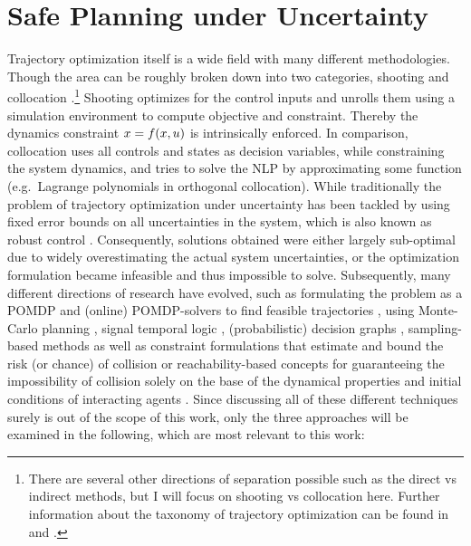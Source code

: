 \section{Safe Planning under Uncertainty}
\label{text:related/uncertainty}
Trajectory optimization itself is a wide field with many different methodologies. Though the area can be roughly broken down into two categories, shooting and collocation \cite{Kelly2017}.\footnote{There are several other directions of separation possible such as the direct vs indirect methods, but I will focus on shooting vs collocation here. Further information about the taxonomy of trajectory optimization can be found in \cite{Kelly2017} and \cite{Chai2020}.} Shooting optimizes for the control inputs and unrolls them using a simulation environment to compute objective and constraint. Thereby the dynamics constraint $x = f(x, u)$ is intrinsically enforced. In comparison, collocation uses all controls and states as decision variables, while constraining the system dynamics, and tries to solve the \ac{NLP} by approximating some function (e.g.\ Lagrange polynomials in orthogonal collocation).
\newline
While traditionally the problem of trajectory optimization under uncertainty has been tackled by using fixed error bounds on all uncertainties in the system, which is also known as robust control \cite{Bemporad1999}. Consequently, solutions obtained were either largely sub-optimal due to widely overestimating the actual system uncertainties, or the optimization formulation became infeasible and thus impossible to solve. Subsequently, many different directions of research have evolved, such as formulating the problem as a \ac{POMDP} and (online) \ac{POMDP}-solvers to find feasible trajectories \cite{Chen2016}, using Monte-Carlo planning \cite{Janson2015} \cite{Silver2010}, signal temporal logic \cite{Sadigh2016}, (probabilistic) decision graphs \cite{Koenig1994}, sampling-based methods as well as constraint formulations that estimate and bound the risk (or chance) of collision \cite{Ono2015}\cite{Lew2019}\cite{Chow2015a}\cite{Chow2015}\cite{Ono2012}\cite{Ludersa}\cite{Luders2011}\cite{Otte2014} or reachability-based concepts for guaranteeing the impossibility of collision solely on the base of the dynamical properties and initial conditions of interacting agents \cite{Leung2020}\cite{Dhinakaran2017}\cite{Margellos2009}\cite{Chen2017b} \cite{Althoff2009}\cite{Althoff2010}. Since discussing all of these different techniques surely is out of the scope of this work, only the three approaches will be examined in the following, which are most relevant to this work:


